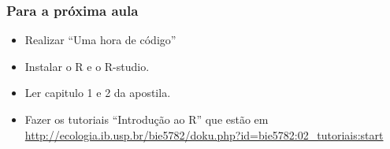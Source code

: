 \documentclass[handout]{beamer}
\begin{document}
\begin{frame}
  \frametitle{Para a próxima aula}
  \begin{itemize}
    \item Realizar ``Uma hora de código''
  \item Instalar o R e o R-studio.
  \item Ler capitulo 1 e 2 da apostila.
  \item  Fazer os tutoriais ``Introdução ao R'' que estão em \url{http://ecologia.ib.usp.br/bie5782/doku.php?id=bie5782:02_tutoriais:start}
  \end{itemize}
  
\end{frame}
\end{document}
